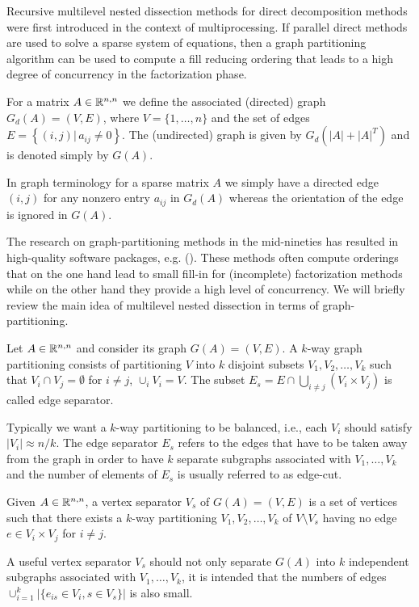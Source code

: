 \label{subsec:mnd}
Recursive multilevel nested dissection methods for direct
decomposition methods were first introduced in the context of
multiprocessing. If parallel direct methods are used to solve a sparse
system of equations, then a graph partitioning algorithm can be used
to compute a fill reducing ordering that leads to a high degree of
concurrency in the factorization phase. 
\begin{definition}\label{def:matrix-graph}
For a matrix $A\in\mathbb{R}^{n,n}$ we
 define the associated (directed) graph $G_d(A)=(V,E)$, where 
$V=\{1,\dots,n\}$ and the set of edges 
$E=\left\{(i,j)|\, a_{ij}\not=0\right\}$.
The (undirected) graph is given by  $G_d(|A|+|A|^T)$ and is denoted
simply by $G(A)$.
\end{definition}
In graph terminology for a sparse matrix $A$ we simply have a directed
edge $(i,j)$ for any nonzero entry $a_{ij}$ in $G_d(A)$ whereas the 
orientation of the edge is ignored in $G(A)$.

The research on graph-partitioning
methods in the mid-nineties has resulted in high-quality software
packages, e.g. \metis {} (\cite{karypis:98}).
These methods often compute orderings that on the one hand lead to small fill-in 
for (incomplete) factorization methods while on the other hand they
provide a high level of concurrency.
We will briefly review the main idea of multilevel nested dissection in
terms of graph-partitioning.
\begin{definition}\label{def:partitioning-and-separator}
Let $A\in\mathbb{R}^{n,n}$
and consider its graph $G(A)=(V,E)$. 
A $k$-way graph partitioning consists of
partitioning $V$ into $k$ disjoint subsets
$V_1, V_2, \ldots, V_k$ such that $V_i \cap V_j = \emptyset$ for $i
\ne j$, $\cup_i V_i=V$.
The subset $E_s = E\cap \bigcup_{i\not=j} (V_i\times V_j)$ is called 
edge separator.
\end{definition}
Typically we want a $k$-way partitioning to be balanced, i.e., 
each $V_i$ should satisfy $|V_i|\approx n/k$. The edge separator $E_s$
refers to the edges that have to be taken away from the graph
in order to have $k$ separate
subgraphs associated with $V_1,\dots,V_k$ and the number of elements of
$E_s$ is usually referred to as edge-cut. 

\begin{definition}\label{def:vertex-separator}
Given $A\in\mathbb{R}^{n,n}$,
    a vertex separator $V_s$ of $G(A)= (V,E)$ is a
    set of vertices such that there exists a $k$-way partitioning 
    $V_1, V_2, \ldots, V_k$ of $V \setminus V_s$ having no edge
    $e\in V_i\times V_j$ for $i\ne j$. 
\end{definition}
A useful vertex separator $V_s$ should not only separate $G(A)$ into
$k$ independent subgraphs associated with $V_1,\dots,V_k$, it is 
intended that the numbers of edges 
$\cup_{i=1}^{k} |\{ e_{is} \in V_i, s \in V_s\}| $ is also small.



